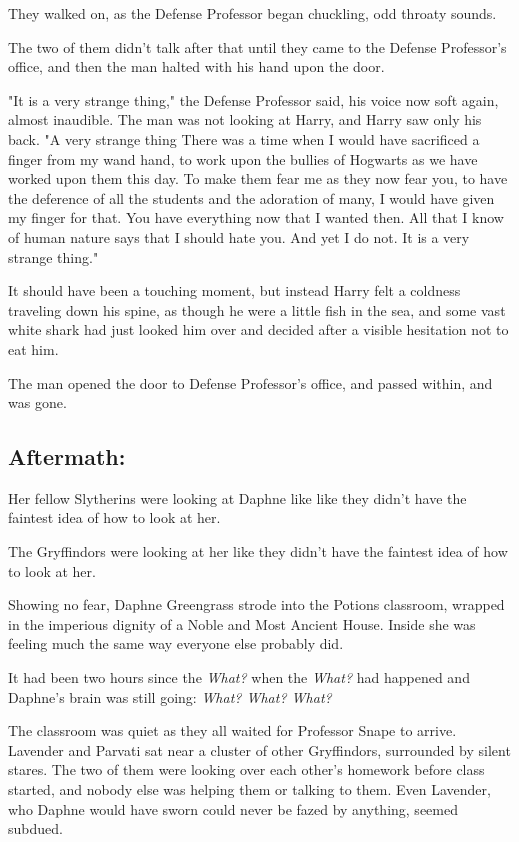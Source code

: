 They walked on, as the Defense Professor began chuckling, odd throaty sounds.

The two of them didn't talk after that until they came to the Defense
Professor's office, and then the man halted with his hand upon the door.

"It is a very strange thing," the Defense Professor said, his voice now soft
again, almost inaudible. The man was not looking at Harry, and Harry saw only
his back. "A very strange thing{\el} There was a time when I would have
sacrificed a finger from my wand hand, to work upon the bullies of Hogwarts as
we have worked upon them this day. To make them fear me as they now fear you,
to have the deference of all the students and the adoration of many, I would
have given my finger for that. You have everything now that I wanted then. All
that I know of human nature says that I should hate you. And yet I do not. It
is a very strange thing."

It should have been a touching moment, but instead Harry felt a coldness
traveling down his spine, as though he were a little fish in the sea, and some
vast white shark had just looked him over and decided after a visible
hesitation not to eat him.

The man opened the door to Defense Professor's office, and passed within, and
was gone.
\sbreak
\vspace{-2\baselineskip}
\subsection{Aftermath:}

Her fellow Slytherins were looking at Daphne like{\el} like they didn't have
the faintest idea of how to look at her.

The Gryffindors were looking at her like they didn't have the faintest idea of
how to look at her.

Showing no fear, Daphne Greengrass strode into the Potions classroom, wrapped
in the imperious dignity of a Noble and Most Ancient House. Inside she was
feeling much the same way everyone else probably did.

It had been two hours since the \emph{What?} when the \emph{What?} had happened
and Daphne's brain was still going: \emph{What? What? What?}

The classroom was quiet as they all waited for Professor Snape to arrive.
Lavender and Parvati sat near a cluster of other Gryffindors, surrounded by
silent stares. The two of them were looking over each other's homework before
class started, and nobody else was helping them or talking to them. Even
Lavender, who Daphne would have sworn could never be fazed by anything, seemed
subdued.


